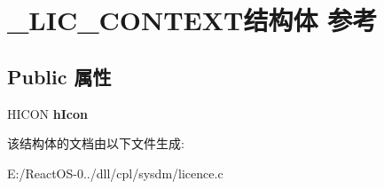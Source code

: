 \hypertarget{struct___l_i_c___c_o_n_t_e_x_t}{}\section{\+\_\+\+L\+I\+C\+\_\+\+C\+O\+N\+T\+E\+X\+T结构体 参考}
\label{struct___l_i_c___c_o_n_t_e_x_t}
\subsection*{Public 属性}
\begin{DoxyCompactItemize}
\item 
\mbox{\label{struct___l_i_c___c_o_n_t_e_x_t_afe9ed63e9559155fabbc6cffb29b4215}} 
H\+I\+C\+ON {\bfseries h\+Icon}
\end{DoxyCompactItemize}


该结构体的文档由以下文件生成\+:\begin{DoxyCompactItemize}
\item 
E\+:/\+React\+O\+S-\/0../dll/cpl/sysdm/licence.\+c\end{DoxyCompactItemize}
